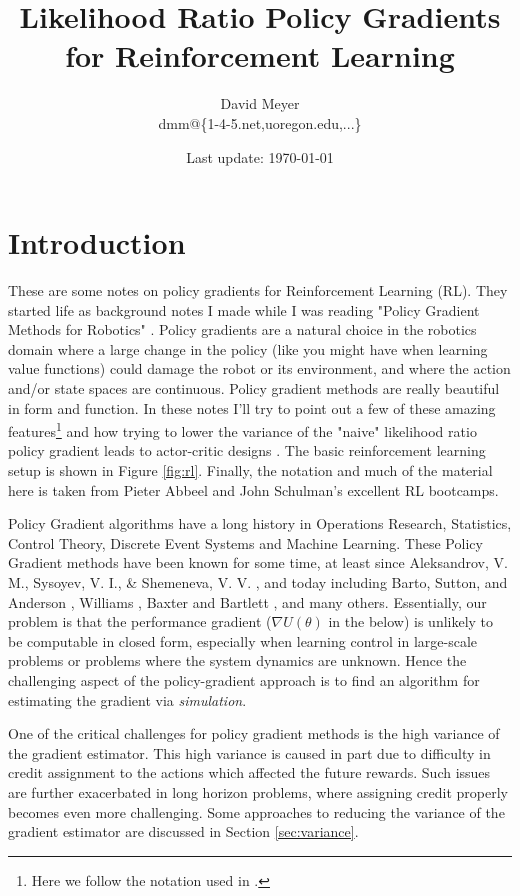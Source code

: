 \documentclass[11pt, oneside]{article}   	%
\title{Likelihood Ratio Policy Gradients for Reinforcement Learning}
\author{David Meyer \\ dmm@\{1-4-5.net,uoregon.edu,...\}}
\date{Last update: \today}							%
\begin{document}
\maketitle

\section{Introduction} 
\label{sec:intro}
These are some notes on policy gradients for Reinforcement Learning (RL). They started life as background notes I made while I was reading "Policy Gradient Methods for Robotics" \cite{Peters:2006fk}. 
Policy gradients are a natural choice in the robotics domain where a large change in the policy (like you might have when learning value functions) could damage the robot or its environment, and
where the action and/or state spaces are continuous. Policy gradient methods are really beautiful in form and function. In these notes I'll try to point out a few of these amazing 
features\footnote{Here we follow the notation used in \cite{SuttonBook}.} and how trying to lower the variance of the "naive" likelihood ratio policy gradient
leads to actor-critic designs \cite{NIPS1999_1786}. The basic reinforcement learning setup is shown in Figure \ref{fig:rl}. 
Finally, the notation and much of the material here is taken from Pieter Abbeel  and John Schulman's excellent RL bootcamps. 



\bigskip
\noindent
Policy Gradient algorithms have a long history in Operations Research, Statistics, Control Theory, Discrete Event Systems and Machine Learning. These
Policy Gradient methods have been known for some time, at least since Aleksandrov, V. M., Sysoyev, V. I., \& Shemeneva, V. V. \cite{oALE68a}, and today including
Barto, Sutton, and Anderson \cite{Barto:1990:NAE:104134.104143}, Williams \cite{Williams1992},  Baxter and Bartlett \cite{Baxter:2001:IPE:1622845.1622855}, 
and many others. Essentially, our problem is that the performance gradient ($\nabla U(\theta)$ in the below) is unlikely to be computable in closed form, especially 
when learning control in large-scale problems or problems where the system dynamics are unknown. Hence the challenging aspect of the policy-gradient approach 
is to find an algorithm for estimating  the gradient via \emph{simulation}.

\bigskip
\noindent
One of the critical challenges for policy gradient methods is the high variance of the gradient estimator. This high variance is caused in part due to difficulty in 
credit assignment to the actions which affected the future rewards. Such issues are further exacerbated in long horizon problems, where assigning credit 
properly becomes even more challenging. Some approaches to reducing the variance of the gradient estimator are discussed in Section \ref{sec:variance}.
\end{document}
